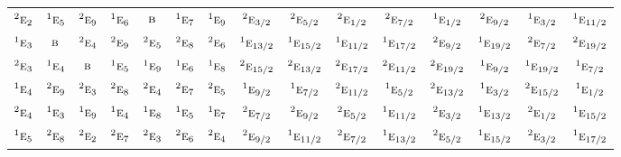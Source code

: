 \documentclass[10pt,a4paper]{article}
\numberwithin{equation}{section}
\newcommand{\irr}[1]{\text{\normalfont\scshape #1}}
\newcommand{\conjpair}[1]{{}^{#1}}
\begin{document}
{\begin{longtable}{@{}lcccccccccccccc@{}}
$\conjpair{2}\irr{e}_{2}$ & $\conjpair{1}\irr{e}_{5}$ & $\conjpair{2}\irr{e}_{9}$ & $\conjpair{1}\irr{e}_{6}$ & $\irr{b}$ & $\conjpair{1}\irr{e}_{7}$ & $\conjpair{1}\irr{e}_{9}$ & $\conjpair{2}\irr{e}_{3/2}$ & $\conjpair{2}\irr{e}_{5/2}$ & $\conjpair{2}\irr{e}_{1/2}$ & $\conjpair{2}\irr{e}_{7/2}$ & $\conjpair{1}\irr{e}_{1/2}$ & $\conjpair{2}\irr{e}_{9/2}$ & $\conjpair{1}\irr{e}_{3/2}$ & $\conjpair{1}\irr{e}_{11/2}$\\
$\conjpair{1}\irr{e}_{3}$ & $\irr{b}$ & $\conjpair{2}\irr{e}_{4}$ & $\conjpair{2}\irr{e}_{9}$ & $\conjpair{2}\irr{e}_{5}$ & $\conjpair{2}\irr{e}_{8}$ & $\conjpair{2}\irr{e}_{6}$ & $\conjpair{1}\irr{e}_{13/2}$ & $\conjpair{1}\irr{e}_{15/2}$ & $\conjpair{1}\irr{e}_{11/2}$ & $\conjpair{1}\irr{e}_{17/2}$ & $\conjpair{2}\irr{e}_{9/2}$ & $\conjpair{1}\irr{e}_{19/2}$ & $\conjpair{2}\irr{e}_{7/2}$ & $\conjpair{2}\irr{e}_{19/2}$\\
$\conjpair{2}\irr{e}_{3}$ & $\conjpair{1}\irr{e}_{4}$ & $\irr{b}$ & $\conjpair{1}\irr{e}_{5}$ & $\conjpair{1}\irr{e}_{9}$ & $\conjpair{1}\irr{e}_{6}$ & $\conjpair{1}\irr{e}_{8}$ & $\conjpair{2}\irr{e}_{15/2}$ & $\conjpair{2}\irr{e}_{13/2}$ & $\conjpair{2}\irr{e}_{17/2}$ & $\conjpair{2}\irr{e}_{11/2}$ & $\conjpair{2}\irr{e}_{19/2}$ & $\conjpair{1}\irr{e}_{9/2}$ & $\conjpair{1}\irr{e}_{19/2}$ & $\conjpair{1}\irr{e}_{7/2}$\\
$\conjpair{1}\irr{e}_{4}$ & $\conjpair{2}\irr{e}_{9}$ & $\conjpair{2}\irr{e}_{3}$ & $\conjpair{2}\irr{e}_{8}$ & $\conjpair{2}\irr{e}_{4}$ & $\conjpair{2}\irr{e}_{7}$ & $\conjpair{2}\irr{e}_{5}$ & $\conjpair{1}\irr{e}_{9/2}$ & $\conjpair{1}\irr{e}_{7/2}$ & $\conjpair{2}\irr{e}_{11/2}$ & $\conjpair{1}\irr{e}_{5/2}$ & $\conjpair{2}\irr{e}_{13/2}$ & $\conjpair{1}\irr{e}_{3/2}$ & $\conjpair{2}\irr{e}_{15/2}$ & $\conjpair{1}\irr{e}_{1/2}$\\
$\conjpair{2}\irr{e}_{4}$ & $\conjpair{1}\irr{e}_{3}$ & $\conjpair{1}\irr{e}_{9}$ & $\conjpair{1}\irr{e}_{4}$ & $\conjpair{1}\irr{e}_{8}$ & $\conjpair{1}\irr{e}_{5}$ & $\conjpair{1}\irr{e}_{7}$ & $\conjpair{2}\irr{e}_{7/2}$ & $\conjpair{2}\irr{e}_{9/2}$ & $\conjpair{2}\irr{e}_{5/2}$ & $\conjpair{1}\irr{e}_{11/2}$ & $\conjpair{2}\irr{e}_{3/2}$ & $\conjpair{1}\irr{e}_{13/2}$ & $\conjpair{2}\irr{e}_{1/2}$ & $\conjpair{1}\irr{e}_{15/2}$\\
$\conjpair{1}\irr{e}_{5}$ & $\conjpair{2}\irr{e}_{8}$ & $\conjpair{2}\irr{e}_{2}$ & $\conjpair{2}\irr{e}_{7}$ & $\conjpair{2}\irr{e}_{3}$ & $\conjpair{2}\irr{e}_{6}$ & $\conjpair{2}\irr{e}_{4}$ & $\conjpair{2}\irr{e}_{9/2}$ & $\conjpair{1}\irr{e}_{11/2}$ & $\conjpair{2}\irr{e}_{7/2}$ & $\conjpair{1}\irr{e}_{13/2}$ & $\conjpair{2}\irr{e}_{5/2}$ & $\conjpair{1}\irr{e}_{15/2}$ & $\conjpair{2}\irr{e}_{3/2}$ & $\conjpair{1}\irr{e}_{17/2}$\\

\end{longtable}}
\end{document}
